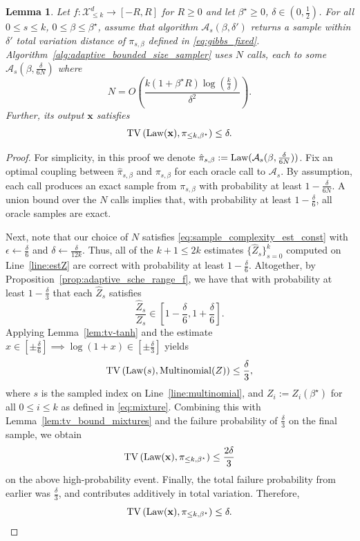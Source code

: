 \documentclass[11pt]{article}
\newtheorem{lemma}{Lemma}
\newcommand{\defeq}{:=}
\newcommand{\eps}{\epsilon}
\newcommand{\half}{\frac{1}{2}}
\newcommand{\1}{\mathbf{1}}
\newcommand{\0}{\mathbf{0}}
\newcommand{\Par}[1]{\left(#1\right)}
\newcommand{\alg}{\mathcal{A}}
\newcommand{\TV}[1]{\mathrm{TV}\left(#1\right)}
\newcommand{\MN}{\mathrm{Multinomial}}
\newcommand{\Law}{\textup{Law}}
\newcommand{\vx}{{\mathbf{x}}}
\newcommand{\calA}{{\mathcal{A}}}
\newcommand{\calX}{{\mathcal{X}}}
\newcommand{\hZ}{\widehat{Z}}
\begin{document}
\begin{lemma}
\label{lem:annealing_sampler_gen_ada}
Let $f: \calX^d_{\le k} \to [-R, R]$ for $R \ge 0$ and let $\beta^\star \ge 0$, $\delta\in (0, \half)$. For all $0 \le s \le k$, $0 \le \beta \le \beta^\star$, assume that algorithm $\calA_s(\beta, \delta')$ returns a sample within $\delta'$ total variation distance of $\pi_{s, \beta}$ defined in \eqref{eq:gibbs_fixed}. 
 Algorithm~\ref{alg:adaptive_bounded_size_sampler} uses $N$ calls, each to some $\calA_s(\beta, \frac \delta {6N})$ where 
 \begin{equation}\label{eq:overall_N}N = O\Par{\frac{k(1 + \beta^\star R  )\log(\frac{k}{\delta})}{\delta^2}}.\end{equation}
 Further, its output $\vx$ satisfies
\[
\TV{\Law(\vx), \pi_{\le k, \beta^\star}} \le \delta.
\]
\end{lemma}
\begin{proof}
For simplicity, in this proof we denote $\hat{\pi}_{s,\beta} \defeq \Law(\alg_s(\beta, \frac{\delta}{6N}))$. 
Fix an optimal coupling between $\hat{\pi}_{s,\beta}$ and $\pi_{s,\beta}$ for each oracle call to $\alg_s$. By assumption, each call produces an exact sample from $\pi_{s,\beta}$ with probability at least $1 - \frac{\delta}{6N}$. A union bound over the $N$ calls implies that, with probability at least $1 - \frac{\delta}{6}$, all oracle samples are exact.

Next, note that our choice of $N$ satisfies \eqref{eq:sample_complexity_est_const} with $\eps \gets \frac \delta 6$ and $\delta \gets \frac{\delta}{12k}$. Thus, all of the $k + 1 \le 2k$ estimates $\{\hZ_s\}_{s = 0}^k$ computed on Line~\ref{line:estZ} are correct with probability at least $1 - \frac \delta 6$. Altogether, by Proposition~\ref{prop:adaptive_sche_range_f}, we have that with probability at least $1 - \frac \delta 3$ that each $\hZ_s$ satisfies
\[
\frac{\hat{Z}_s}{Z_s} \in \left[1 - \frac{\delta}{6}, 1 + \frac{\delta}{6}\right].
\]
Applying Lemma~\ref{lem:tv-tanh} and the estimate $x \in [\pm \frac \delta 6] \implies \log(1 + x) \in [\pm \frac \delta 3]$ yields
\[
\TV{\Law(s), \MN(Z)} \le \frac{\delta}{3},
\]
where $s$ is the sampled index on Line~\ref{line:multinomial}, and $Z_i \defeq Z_i(\beta^\star)$ for all $0 \le i \le k$ as defined in \eqref{eq:mixture}.
Combining this with Lemma~\ref{lem:tv_bound_mixtures} and the failure probability of $\frac{\delta}{3}$ on the final sample, we obtain
\[
\TV{\Law(\vx), \pi_{\le k, \beta^\star}} \le \frac{2\delta}{3}
\]
on the above high-probability event.
Finally, the total failure probability from earlier was $\frac \delta 3$, and contributes additively in total variation. Therefore,
\[
\TV{\Law(\vx), \pi_{\le k, \beta^\star}} \le \delta.
\]
\end{proof}
\end{document}
